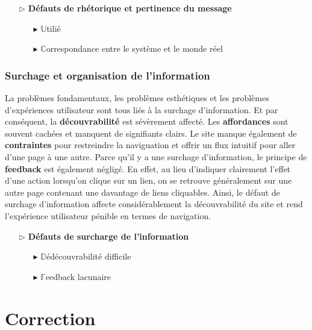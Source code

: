 \documentclass[9pt]{report}
\begin{document}
\begin{multicols*}{2}
  \begin{itemize}
    \item [$\rhd$ ] \textbf{Défauts de rhétorique et pertinence du message}  
      \begin{itemize}
        \item [$\blacktriangleright$ ] $\mathbb{U}$tilié
        \item [$\blacktriangleright$ ] $\mathbb{C}$orrespondance entre le système et le monde réel
      \end{itemize}
  \end{itemize}

  \subsection{Surchage et organisation de l'information} 
  La problèmes fondamentaux, les problèmes esthétiques et 
  les problèmes d'expériences utilisateur sont tous 
  liés à la surchage d'information.  Et par conséquent, la 
  \textbf{découvrabilité} est sévèrement affecté. 
  Les \textbf{affordances} sont souvent cachées et manquent 
  de signifiants clairs. Le site manque également de 
  \textbf{contraintes} pour restreindre la naviguation et 
  offrir un flux intuitif pour aller d'une page à une autre. Parce qu'il 
  y a une surchage d'information, le principe de \textbf{feedback} est 
  également négligé. En effet, au lieu d'indiquer clairement 
  l'effet d'une action lorsqu'on clique sur un lien, on 
  se retrouve généralement sur une autre page contenant 
  une davantage de liens cliquables. Ainsi, le défaut de surchage 
  d'information affecte considérablement la découvrabilité 
  du site et rend l'expérience utilisateur pénible en termes de 
  navigation. 


  \begin{itemize}
    \item [$\rhd$ ] \textbf{Défauts de surcharge de l'information}  
      \begin{itemize}
        \item [$\blacktriangleright$ ] $\mathbb{D}$édécouvrabilité difficile
        \item [$\blacktriangleright$ ] $\mathbb{F}$eedback lacunaire
      \end{itemize}
  \end{itemize}

  \chapter{Correction}


\end{multicols*}
\end{document}
